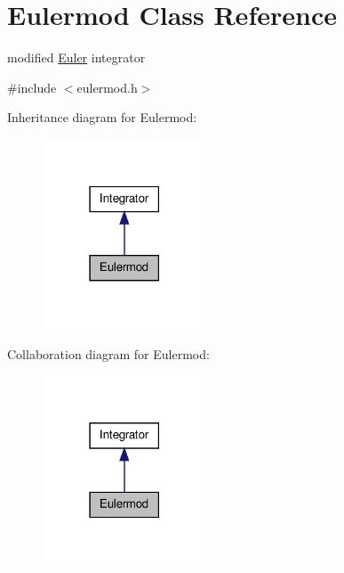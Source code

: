 \hypertarget{classEulermod}{\section{\-Eulermod \-Class \-Reference}
\label{classEulermod}
}


modified \hyperlink{classEuler}{\-Euler} integrator  




{\ttfamily \#include $<$eulermod.\-h$>$}



\-Inheritance diagram for \-Eulermod\-:\nopagebreak
\begin{figure}[H]
\begin{center}
\leavevmode
\includegraphics[width=138pt]{classEulermod__inherit__graph}
\end{center}
\end{figure}


\-Collaboration diagram for \-Eulermod\-:\nopagebreak
\begin{figure}[H]
\begin{center}
\leavevmode
\includegraphics[width=138pt]{classEulermod__coll__graph}
\end{center}
\end{figure}
